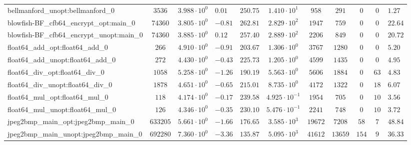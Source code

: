 \begin{tabular}{|l|c|HHc|c|c|c|c|cH|}
bellmanford\_unopt:bellmanford\_0               & $ 3536     $ & $ 3.988 \cdot 10^{0} $ & $ 0.01  $ & $ 250.75 $ & $ 1.410 \cdot 10^{1}  $ & $ 958    $ & $ 291   $ & $ 0   $ & $ 0   $ & $ 1.27    $ \\
blowfish-BF\_cfb64\_encrypt\_opt:main\_0        & $ 74360    $ & $ 3.805 \cdot 10^{0} $ & $ -0.81 $ & $ 262.81 $ & $ 2.829 \cdot 10^{2}  $ & $ 1947   $ & $ 759   $ & $ 0   $ & $ 0   $ & $ 22.64   $ \\
blowfish-BF\_cfb64\_encrypt\_unopt:main\_0      & $ 74360    $ & $ 3.885 \cdot 10^{0} $ & $ 0.12  $ & $ 257.40 $ & $ 2.889 \cdot 10^{2}  $ & $ 2206   $ & $ 849   $ & $ 0   $ & $ 0   $ & $ 20.72   $ \\
float64\_add\_opt:float64\_add\_0               & $ 266      $ & $ 4.910 \cdot 10^{0} $ & $ -0.91 $ & $ 203.67 $ & $ 1.306 \cdot 10^{0}  $ & $ 3767   $ & $ 1280  $ & $ 0   $ & $ 0   $ & $ 5.20    $ \\
float64\_add\_unopt:float64\_add\_0             & $ 272      $ & $ 4.430 \cdot 10^{0} $ & $ -0.43 $ & $ 225.73 $ & $ 1.205 \cdot 10^{0}  $ & $ 4599   $ & $ 1435  $ & $ 0   $ & $ 0   $ & $ 4.95    $ \\
float64\_div\_opt:float64\_div\_0               & $ 1058     $ & $ 5.258 \cdot 10^{0} $ & $ -1.26 $ & $ 190.19 $ & $ 5.563 \cdot 10^{0}  $ & $ 5606   $ & $ 1884  $ & $ 0   $ & $ 63  $ & $ 4.83    $ \\
float64\_div\_unopt:float64\_div\_0             & $ 1878     $ & $ 4.651 \cdot 10^{0} $ & $ -0.65 $ & $ 215.01 $ & $ 8.735 \cdot 10^{0}  $ & $ 4172   $ & $ 1322  $ & $ 0   $ & $ 18  $ & $ 6.07    $ \\
float64\_mul\_opt:float64\_mul\_0               & $ 118      $ & $ 4.174 \cdot 10^{0} $ & $ -0.17 $ & $ 239.58 $ & $ 4.925 \cdot 10^{-1} $ & $ 1954   $ & $ 705   $ & $ 0   $ & $ 10  $ & $ 3.56    $ \\
float64\_mul\_unopt:float64\_mul\_0             & $ 126      $ & $ 4.346 \cdot 10^{0} $ & $ -0.35 $ & $ 230.10 $ & $ 5.476 \cdot 10^{-1} $ & $ 2241   $ & $ 748   $ & $ 0   $ & $ 10  $ & $ 3.72    $ \\
jpeg2bmp\_main\_opt:jpeg2bmp\_main\_0           & $ 633205   $ & $ 5.661 \cdot 10^{0} $ & $ -1.66 $ & $ 176.65 $ & $ 3.585 \cdot 10^{3}  $ & $ 19672  $ & $ 7208  $ & $ 58  $ & $ 7   $ & $ 48.84   $ \\
jpeg2bmp\_main\_unopt:jpeg2bmp\_main\_0         & $ 692280   $ & $ 7.360 \cdot 10^{0} $ & $ -3.36 $ & $ 135.87 $ & $ 5.095 \cdot 10^{3}  $ & $ 41612  $ & $ 13659 $ & $ 154 $ & $ 9   $ & $ 36.33   $ \\

\end{tabular}
